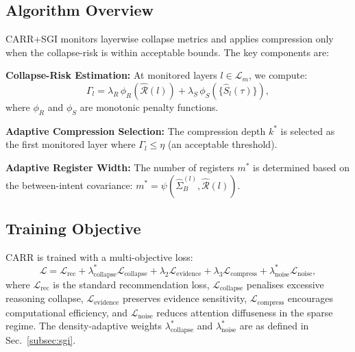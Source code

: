 \documentclass[lettersize,journal]{IEEEtran}
\begin{document}
\subsection{Algorithm Overview}
CARR+SGI monitors layerwise collapse metrics and applies compression only when the collapse-risk is within acceptable bounds. The key components are:

\textbf{Collapse-Risk Estimation:} At monitored layers $l \in \mathcal{L}_m$, we compute:
\begin{equation}
\Gamma_l = \lambda_R \,\phi_R(\widehat{\mathcal{R}}(l)) + \lambda_S \,\phi_S(\{\widehat{S}_l(\tau)\}),
\end{equation}
where $\phi_R$ and $\phi_S$ are monotonic penalty functions.

\textbf{Adaptive Compression Selection:} The compression depth $k^*$ is selected as the first monitored layer where $\Gamma_l \le \eta$ (an acceptable threshold).

\textbf{Adaptive Register Width:} The number of registers $m^*$ is determined based on the between-intent covariance: $m^* = \psi(\widehat{\Sigma}_B^{(l)}, \widehat{\mathcal{R}}(l))$.

\subsection{Training Objective}
CARR is trained with a multi-objective loss:
\begin{equation}
\mathcal{L} =
\mathcal{L}_{\mathrm{rec}} +
\lambda_{\mathrm{collapse}}^* \mathcal{L}_{\mathrm{collapse}} +
\lambda_2 \mathcal{L}_{\mathrm{evidence}} +
\lambda_3 \mathcal{L}_{\mathrm{compress}} +
\lambda_{\mathrm{noise}}^* \mathcal{L}_{\mathrm{noise}},
\end{equation}
where $\mathcal{L}_{\mathrm{rec}}$ is the standard recommendation loss, $\mathcal{L}_{\mathrm{collapse}}$ penalises excessive reasoning collapse, $\mathcal{L}_{\mathrm{evidence}}$ preserves evidence sensitivity, $\mathcal{L}_{\mathrm{compress}}$ encourages computational efficiency, and $\mathcal{L}_{\mathrm{noise}}$ reduces attention diffuseness in the sparse regime. The density-adaptive weights $\lambda_{\mathrm{collapse}}^*$ and $\lambda_{\mathrm{noise}}^*$ are as defined in Sec.~\ref{subsec:sgi}.
\end{document}
